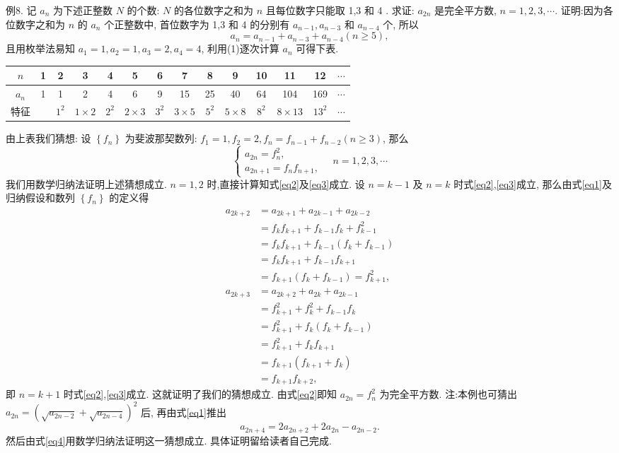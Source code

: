 例8. 记 $a_n$ 为下述正整数 $N$ 的个数: $N$ 的各位数字之和为 $n$ 且每位数字只能取 1,3 和 4 . 求证: $a_{2 n}$ 是完全平方数, $n=1,2,3, \cdots$. 
证明:因为各位数字之和为 $n$ 的 $a_n$ 个正整数中, 首位数字为 1,3 和 4 的分别有 $a_{n-1}, a_{n-3}$ 和 $a_{n-4}$ 个, 所以
$$
a_n=a_{n-1}+a_{n-3}+a_{n-4}(n \geqslant 5), \label{eq1}
$$
且用枚举法易知 $a_1=1, a_2=1, a_3=2, a_4=4$, 利用(1)逐次计算 $a_n$ 可得下表.
\begin{tabular}{|c|c|c|c|c|c|c|c|c|c|c|c|c|c|}
\hline$n$ & 1 & 2 & 3 & 4 & 5 & 6 & 7 & 8 & 9 & 10 & 11 & 12 & $\cdots$ \\
\hline$a_n$ & 1 & 1 & 2 & 4 & 6 & 9 & 15 & 25 & 40 & 64 & 104 & 169 & $\cdots$ \\
\hline 特征 & & $1^2$ & $1 \times 2$ & $2^2$ & $2 \times 3$ & $3^2$ & $3 \times 5$ & $5^2$ & $5 \times 8$ & $8^2$ & $8 \times 13$ & $13^2$ & $\cdots$ \\
\hline
\end{tabular}
由上表我们猜想:
设 $\left\{f_n\right\}$ 为斐波那契数列: $f_1=1, f_2=2, f_n=f_{n-1}+f_{n-2}(n \geqslant 3)$, 那么
$$
\left\{\begin{array}{l}
a_{2 n}=f_n^2, \label{eq2} \\
a_{2 n+1}=f_n f_{n+1}, \label{eq3}
\end{array} \quad n=1,2,3, \cdots\right.
$$
我们用数学归纳法证明上述猜想成立.
$n=1,2$ 时,直接计算知式\ref{eq2}及\ref{eq3}成立.
设 $n=k-1$ 及 $n=k$ 时式\ref{eq2},\ref{eq3}成立, 那么由式\ref{eq1}及归纳假设和数列 $\left\{f_n\right\}$ 的定义得
$$
\begin{aligned}
a_{2 k+2} & =a_{2 k+1}+a_{2 k-1}+a_{2 k-2} \\
& =f_k f_{k+1}+f_{k-1} f_k+f_{k-1}^2 \\
& =f_k f_{k+1}+f_{k-1}\left(f_k+f_{k-1}\right) \\
& =f_k f_{k+1}+f_{k-1} f_{k+1} \\
& =f_{k+1}\left(f_k+f_{k-1}\right)=f_{k+1}^2, \\
a_{2 k+3} & =a_{2 k+2}+a_{2 k}+a_{2 k-1} \\
& =f_{k+1}^2+f_k^2+f_{k-1} f_k \\
& =f_{k+1}^2+f_k\left(f_k+f_{k-1}\right) \\
& =f_{k+1}^2+f_k f_{k+1} \\
& =f_{k+1}\left(f_{k+1}+f_k\right) \\
& =f_{k+1} f_{k+2},
\end{aligned}
$$
即 $n=k+1$ 时式\ref{eq2},\ref{eq3}成立.
这就证明了我们的猜想成立.
由式\ref{eq2}即知 $a_{2 n}=f_n^2$ 为完全平方数.
注:本例也可猜出 $a_{2 n}=\left(\sqrt{a_{2 n-2}}+\sqrt{a_{2 n-4}}\right)^2$ 后, 再由式\ref{eq1}推出
$$
a_{2 n+4}=2 a_{2 n+2}+2 a_{2 n}-a_{2 n-2} . \label{eq4}
$$
然后由式\ref{eq4}用数学归纳法证明这一猜想成立.
具体证明留给读者自己完成.



